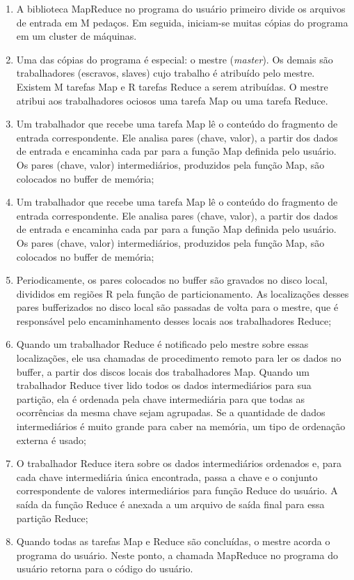 \begin{enumerate}
\item A biblioteca MapReduce no programa do usuário primeiro divide os arquivos de entrada em M pedaços. Em seguida, iniciam-se muitas cópias do programa em um cluster de máquinas.

\item Uma das cópias do programa é especial: o mestre (\textit{master}). Os demais são trabalhadores (escravos, slaves) cujo trabalho é atribuído pelo mestre. Existem M tarefas Map e R tarefas Reduce a serem atribuídas. O mestre atribui aos trabalhadores ociosos uma tarefa Map ou uma tarefa Reduce.

\item Um trabalhador que recebe uma tarefa Map lê o conteúdo do fragmento de entrada correspondente. Ele analisa pares (chave, valor), a partir dos dados de entrada e encaminha cada par para a função Map definida pelo usuário. Os pares (chave, valor) intermediários, produzidos pela função Map, são colocados no buffer de memória;

\item Um trabalhador que recebe uma tarefa Map lê o conteúdo do fragmento de entrada correspondente. Ele analisa pares (chave, valor), a partir dos dados de entrada e encaminha cada par para a função Map definida pelo usuário. Os pares (chave, valor) intermediários, produzidos pela função Map, são colocados no buffer de memória;

\item Periodicamente, os pares colocados no buffer são gravados no disco local, divididos em regiões R pela função de particionamento. As localizações desses pares bufferizados no disco local são passadas de volta para o mestre, que é responsável pelo encaminhamento desses locais aos trabalhadores Reduce;

\item Quando um trabalhador Reduce é notificado pelo mestre sobre essas localizações, ele usa chamadas de procedimento remoto para ler os dados no buffer, a partir dos discos locais dos trabalhadores Map. Quando um trabalhador Reduce tiver lido todos os dados intermediários para sua partição, ela é ordenada pela chave intermediária para que todas as ocorrências da mesma chave sejam agrupadas. Se a quantidade de dados intermediários é muito grande para caber na memória, um tipo de ordenação externa é usado;

\item O trabalhador Reduce itera sobre os dados intermediários ordenados e, para cada chave intermediária única encontrada, passa a chave e o conjunto correspondente de valores intermediários para função Reduce do usuário. A saída da função Reduce é anexada a um arquivo de saída final para essa partição Reduce;

\item Quando todas as tarefas Map e Reduce são concluídas, o mestre acorda o programa do usuário. Neste ponto, a chamada MapReduce no programa do usuário retorna para o código do usuário.
              	        	
\end{enumerate}


